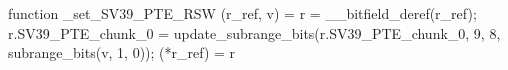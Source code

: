 function _set_SV39_PTE_RSW (r_ref, v) = {
    r = __bitfield_deref(r_ref);
    r.SV39_PTE_chunk_0 = update_subrange_bits(r.SV39_PTE_chunk_0, 9, 8, subrange_bits(v, 1, 0));
    (*r_ref) = r
}
